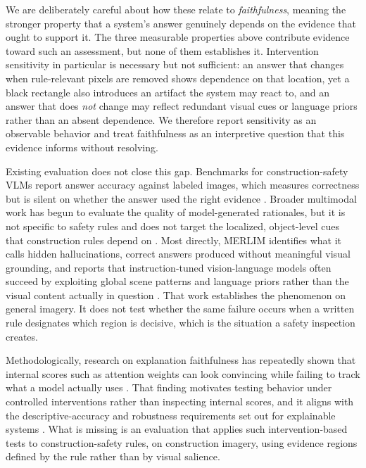 \documentclass[conference]{IEEEtran}
\begin{document}
We are deliberately careful about how these relate to \textit{faithfulness}, meaning the stronger property that a system's answer genuinely depends on the evidence that ought to support it. The three measurable properties above contribute evidence toward such an assessment, but none of them establishes it. Intervention sensitivity in particular is necessary but not sufficient: an answer that changes when rule-relevant pixels are removed shows dependence on that location, yet a black rectangle also introduces an artifact the system may react to, and an answer that does \textit{not} change may reflect redundant visual cues or language priors rather than an absent dependence. We therefore report sensitivity as an observable behavior and treat faithfulness as an interpretive question that this evidence informs without resolving.

Existing evaluation does not close this gap. Benchmarks for construction-safety VLMs report answer accuracy against labeled images, which measures correctness but is silent on whether the answer used the right evidence \cite{chen2025}. Broader multimodal work has begun to evaluate the quality of model-generated rationales, but it is not specific to safety rules and does not target the localized, object-level cues that construction rules depend on \cite{li2025}. Most directly, MERLIM identifies what it calls hidden hallucinations, correct answers produced without meaningful visual grounding, and reports that instruction-tuned vision-language models often succeed by exploiting global scene patterns and language priors rather than the visual content actually in question \cite{villa2025}. That work establishes the phenomenon on general imagery. It does not test whether the same failure occurs when a written rule designates which region is decisive, which is the situation a safety inspection creates.

Methodologically, research on explanation faithfulness has repeatedly shown that internal scores such as attention weights can look convincing while failing to track what a model actually uses \cite{jain2019,wu2024}. That finding motivates testing behavior under controlled interventions rather than inspecting internal scores, and it aligns with the descriptive-accuracy and robustness requirements set out for explainable systems \cite{phillips2021}. What is missing is an evaluation that applies such intervention-based tests to construction-safety rules, on construction imagery, using evidence regions defined by the rule rather than by visual salience.
\end{document}

